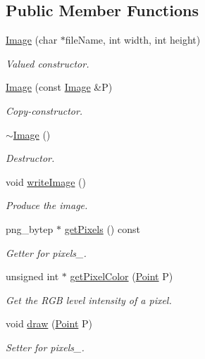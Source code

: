 \subsection*{Public Member Functions}
\begin{DoxyCompactItemize}
\item 
\mbox{\hyperlink{class_image_a742d8eafbcfe7e0b66a145bac182adb3}{Image}} (char $\ast$file\+Name, int width, int height)
\begin{DoxyCompactList}\small\item\em Valued constructor. \end{DoxyCompactList}\item 
\mbox{\hyperlink{class_image_a7d0a9bb68362e0ec28d5d2c600cc9b59}{Image}} (const \mbox{\hyperlink{class_image}{Image}} \&P)
\begin{DoxyCompactList}\small\item\em Copy-\/constructor. \end{DoxyCompactList}\item 
\mbox{\hyperlink{class_image_a0294f63700543e11c0f0da85601c7ae5}{$\sim$\+Image}} ()
\begin{DoxyCompactList}\small\item\em Destructor. \end{DoxyCompactList}\item 
void \mbox{\hyperlink{class_image_ac34bdffd357a50025e6a72deb02596b5}{write\+Image}} ()
\begin{DoxyCompactList}\small\item\em Produce the image. \end{DoxyCompactList}\item 
png\+\_\+bytep $\ast$ \mbox{\hyperlink{class_image_a434149170df3e6fad24cc123c8ff029d}{get\+Pixels}} () const
\begin{DoxyCompactList}\small\item\em Getter for pixels\+\_\+. \end{DoxyCompactList}\item 
unsigned int $\ast$ \mbox{\hyperlink{class_image_adb23176701dae47479d4919f55f3aec5}{get\+Pixel\+Color}} (\mbox{\hyperlink{class_point}{Point}} P)
\begin{DoxyCompactList}\small\item\em Get the R\+GB level intensity of a pixel. \end{DoxyCompactList}\item 
void \mbox{\hyperlink{class_image_a8d162f3cab956131d58708c09aa560b0}{draw}} (\mbox{\hyperlink{class_point}{Point}} P)
\begin{DoxyCompactList}\small\item\em Setter for pixels\+\_\+. \end{DoxyCompactList}\item 

\end{DoxyCompactItemize}

